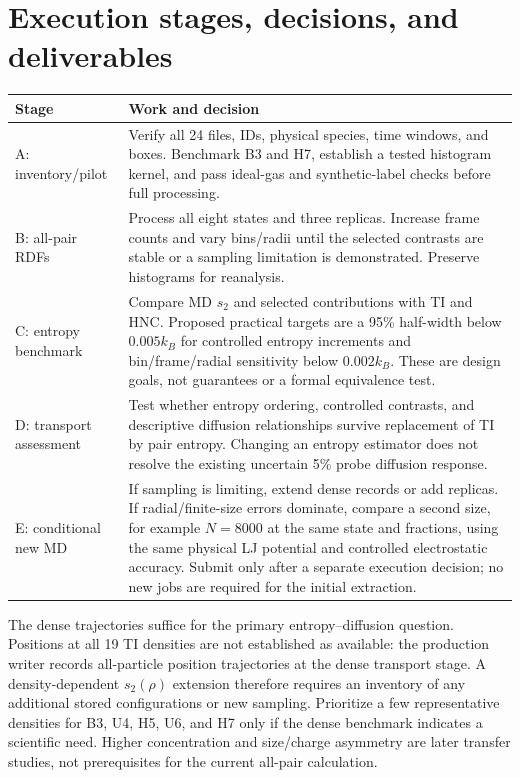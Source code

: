 \documentclass[11pt,a4paper]{article}
\begin{document}
\section{Execution stages, decisions, and deliverables}
\begin{longtable}{@{}p{}p{}@{}}
\toprule
Stage & Work and decision\\
\midrule
\endhead
A: inventory/pilot & Verify all 24 files, IDs, physical species, time windows,
and boxes. Benchmark B3 and H7, establish a tested histogram kernel, and pass
ideal-gas and synthetic-label checks before full processing.\\[3pt]
B: all-pair RDFs & Process all eight states and three replicas. Increase frame
counts and vary bins/radii until the selected contrasts are stable or a
sampling limitation is demonstrated. Preserve histograms for reanalysis.\\[3pt]
C: entropy benchmark & Compare MD $s_2$ and selected contributions with TI and
HNC. Proposed practical targets are a 95\% half-width below $0.005k_B$ for
controlled entropy increments and bin/frame/radial sensitivity below
$0.002k_B$. These are design goals, not guarantees or a formal equivalence test.\\[3pt]
D: transport assessment & Test whether entropy ordering, controlled contrasts,
and descriptive diffusion relationships survive replacement of TI by pair
entropy. Changing an entropy estimator does not resolve the existing uncertain
5\% probe diffusion response.\\[3pt]
E: conditional new MD & If sampling is limiting, extend dense records or add
replicas. If radial/finite-size errors dominate, compare a second size, for
example $N=8000$ at the same state and fractions, using the same physical LJ
potential and controlled electrostatic accuracy. Submit only after a separate
execution decision; no new jobs are required for the initial extraction.\\
\bottomrule
\end{longtable}

The dense trajectories suffice for the primary entropy--diffusion question.
Positions at all 19 TI densities are not established as available: the
production writer records all-particle position trajectories at the dense
transport stage. A density-dependent $s_2(\rho)$ extension therefore requires
an inventory of any additional stored configurations or new sampling.
Prioritize a few representative densities for B3, U4, H5, U6, and H7 only if
the dense benchmark indicates a scientific need. Higher concentration and
size/charge asymmetry are later transfer studies, not prerequisites for the
current all-pair calculation.
\end{document}
